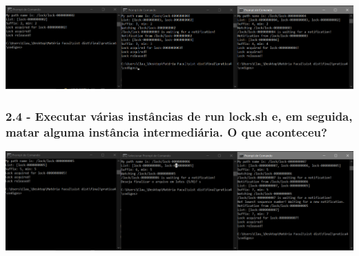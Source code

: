 \includegraphics[width=20cm]{pratica4/prints/roteiro 2.3.PNG}

\subsubsection{2.4 - Executar várias instâncias de run lock.sh e, em seguida, matar
alguma instância intermediária. O que aconteceu?}
\includegraphics[width=20cm]{pratica4/prints/roteiro 2.4.PNG}
